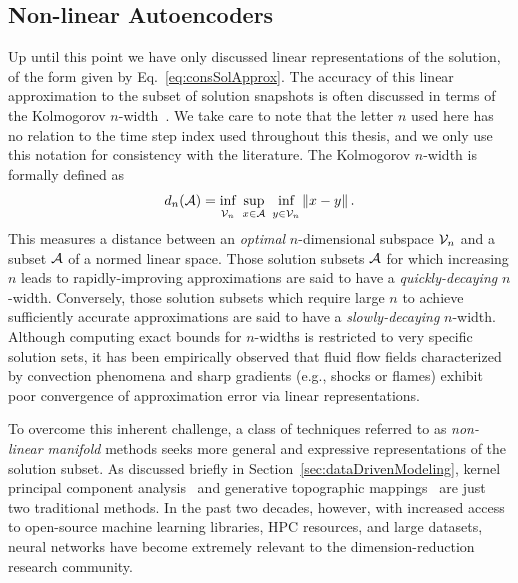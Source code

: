 \subsection{Non-linear Autoencoders}\label{subsec:nonlinManifold}

Up until this point we have only discussed linear representations of the solution, of the form given by Eq.~\ref{eq:consSolApprox}. The accuracy of this linear approximation to the subset of solution snapshots is often discussed in terms of the Kolmogorov $n$-width~\cite{Pinkus1985}. We take care to note that the letter $n$ used here has no relation to the time step index used throughout this thesis, and we only use this notation for consistency with the literature. The Kolmogorov $n$-width is formally defined as
%
\begin{equation}\label{eq:nwidth}
    d_n(\mathcal{A}) = \underset{\mathcal{V}_n}{\vphantom{sup}\text{inf}} \enspace \underset{x \in \mathcal{A}}{\text{sup}} \enspace \underset{y \in \mathcal{V}_n}{\vphantom{sup}\text{inf}} \left\Vert x - y \right\Vert.
\end{equation}
%
This measures a distance between an \textit{optimal} $n$-dimensional subspace $\mathcal{V}_n$ and a subset $\mathcal{A}$ of a normed linear space. Those solution subsets $\mathcal{A}$ for which increasing $n$ leads to rapidly-improving approximations are said to have a \textit{quickly-decaying} $n$-width. Conversely, those solution subsets which require large $n$ to achieve sufficiently accurate approximations are said to have a \textit{slowly-decaying} $n$-width. Although computing exact bounds for $n$-widths is restricted to very specific solution sets, it has been empirically observed that fluid flow fields characterized by convection phenomena and sharp gradients (e.g., shocks or flames) exhibit poor convergence of approximation error via linear representations.

To overcome this inherent challenge, a class of techniques referred to as \textit{non-linear manifold} methods seeks more general and expressive representations of the solution subset. As discussed briefly in Section~\ref{sec:dataDrivenModeling}, kernel principal component analysis~\cite{kernelPCA} and generative topographic mappings~\cite{Bishop1997} are just two traditional methods. In the past two decades, however, with increased access to open-source machine learning libraries, HPC resources, and large datasets, neural networks have become extremely relevant to the dimension-reduction research community.


